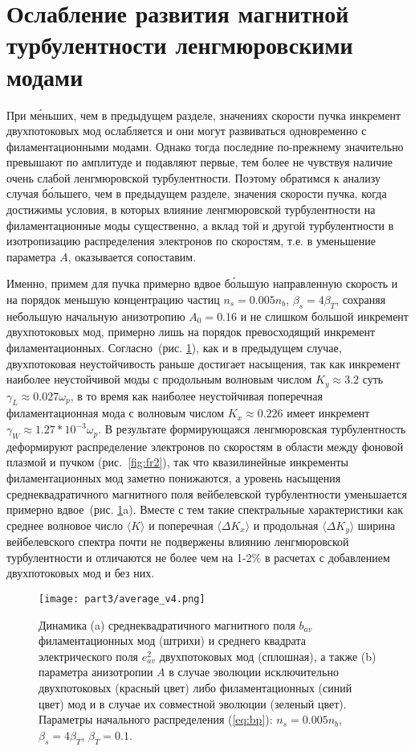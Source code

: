 \section{Ослабление развития магнитной турбулентности ленгмюровскими модами}

При м\'{е}ньших, чем в предыдущем разделе, значениях скорости пучка инкремент двухпотоковых мод ослабляется и они могут развиваться одновременно с филаментационными модами. Однако тогда последние по-прежнему значительно превышают по амплитуде и подавляют первые, тем более не чувствуя наличие очень слабой ленгмюровской турбулентности. Поэтому обратимся к анализу случая б\'{о}льшего, чем в предыдущем разделе, значения скорости пучка, когда достижимы условия, в которых влияние ленгмюровской турбулентности на филаментационные моды существенно, а вклад той и другой турбулентности в изотропизацию распределения электронов по скоростям, т.е. в уменьшение параметра $A$, оказывается сопоставим.

Именно, примем для пучка примерно вдвое б\'{о}льшую направленную скорость и на порядок меньшую концентрацию частиц $n_s=0.005n_b$, $\beta_s=4\beta_T$, сохраняя небольшую начальную анизотропию $A_0=0.16$ и не слишком большой инкремент двухпотоковых мод, примерно лишь на порядок превосходящий инкремент филаментационных. Согласно~(рис. \ref{fig:average_v4}), как и в предыдущем случае, двухпотоковая неустойчивость раньше достигает насыщения, так как инкремент наиболее неустойчивой моды с продольным волновым числом $K_y\approx 3.2$ суть $\gamma_{L}\approx0.027\omega_p$, в то время как наиболее неустойчивая поперечная филаментационная мода с волновым числом $K_x\approx 0.226$ имеет инкремент $\gamma_W\approx1.27*10^{-3}\omega_p$. В результате формирующаяся ленгмюровская турбулентность деформируют распределение электронов по скоростям в области между фоновой плазмой и пучком (рис.~\ref{fig:fr2}), так что квазилинейные инкременты филаментационных мод заметно понижаются, а уровень насыщения среднеквадратичного магнитного поля вейбелевской турбулентности уменьшается примерно вдвое~(рис. \ref{fig:average_v4}a). Вместе с тем такие спектральные характеристики как среднее волновое число $\langle K\rangle$ и поперечная  $\langle\Delta K_x\rangle$  и продольная $\langle \Delta K_y\rangle$ ширина вейбелевского спектра почти не подвержены влиянию ленгмюровской турбулентности и отличаются не более чем на 1-2\% в расчетах с добавлением двухпотоковых мод и без них. 

\begin{figure}[h]
\texttt{[image: part3/average\_v4.png]}
\centering
{}
\caption{Динамика (a) среднеквадратичного магнитного поля $b_{av}$ филаментационных мод (штрихи) и среднего квадрата электрического поля $e_{av}^2$ двухпотоковых мод (сплошная), а также (b) параметра анизотропии $A$ в случае эволюции исключительно двухпотоковых (красный цвет) либо филаментационных (синий цвет) мод и в случае их совместной эволюции (зеленый цвет). Параметры начального распределения (\ref{eq:bp}): $n_s=0.005n_b$, $\beta_s=4\beta_T$, $\beta_T=0.1$.} 
\label{fig:average_v4}
\end{figure}

